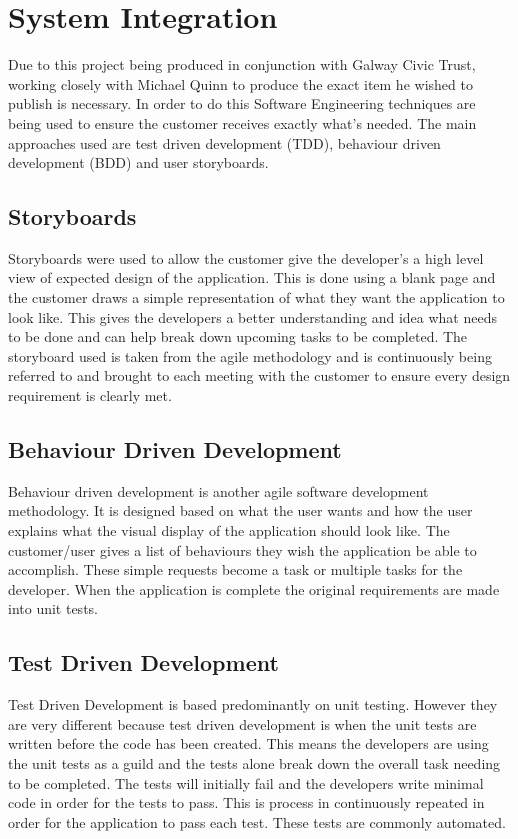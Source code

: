 \section{System Integration}
Due to this project being produced in conjunction with Galway Civic Trust, working closely with Michael Quinn to produce the exact item he wished to publish is necessary. In order to do this Software Engineering techniques are being used to ensure the customer receives exactly what’s needed. The main approaches used are test driven development (TDD), behaviour driven development (BDD) and user storyboards.

\subsection{Storyboards}

Storyboards were used to allow the customer give the developer’s a high level view of expected design of the application. This is done using a blank page and the customer draws a simple representation of what they want the application to look like. This gives the developers a better understanding and idea what needs to be done and can help break down upcoming tasks to be completed. The storyboard used is taken from the agile methodology and is continuously being referred to and brought to each meeting with the customer to ensure every design requirement is clearly met. \cite{StoryBoard}

\subsection{Behaviour Driven Development}

Behaviour driven development is another agile software development methodology. It is designed based on what the user wants and how the user explains what the visual display of the application should look like. The customer/user gives a list of behaviours they wish the application be able to accomplish. These simple requests become a task or multiple tasks for the developer. When the application is complete the original requirements are made into unit tests.\cite{BDD} 

\subsection{Test Driven Development}

Test Driven Development is based predominantly on unit testing. However they are very different because test driven development is when the unit tests are written before the code has been created. This means the developers are using the unit tests as a guild and the tests alone break down the overall task needing to be completed. The tests will initially fail and the developers write minimal code in order for the tests to pass. This is process in continuously repeated in order for the application to pass each test. These tests are commonly automated.\cite{TDD}

